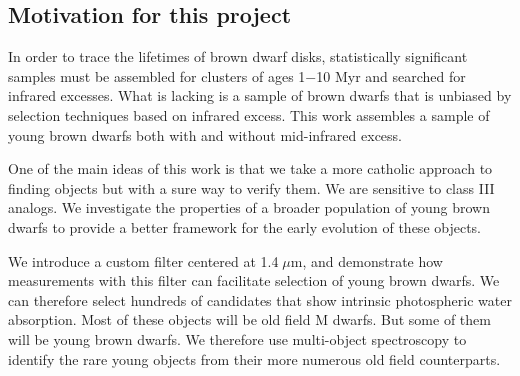 
\subsection{Motivation for this project}


In order to trace the lifetimes of brown dwarf disks, statistically significant samples must be assembled for clusters of ages 1$-$10 Myr and searched for infrared excesses.  What is lacking is a sample of brown dwarfs that is unbiased by selection techniques based on infrared excess.  This work assembles a sample of young brown dwarfs both with and without mid-infrared excess.

One of the main ideas of this work is that we take a more catholic approach to finding objects but with a sure way to verify them.  We are sensitive to class III analogs.  We investigate the properties of a broader population of young brown dwarfs to provide a better framework for the early evolution of these objects.

We introduce a custom filter centered at 1.4$\;\mu$m, and demonstrate how measurements with this filter can facilitate selection of young brown dwarfs.  We can therefore select hundreds of candidates that show intrinsic photospheric water absorption.  Most of these objects will be old field M dwarfs.  But some of them will be young brown dwarfs.  We therefore use multi-object spectroscopy to identify the rare young objects from their more numerous old field counterparts.

